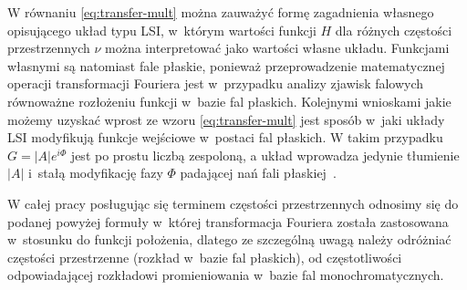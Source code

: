 W równaniu \ref{eq:transfer-mult} można zauważyć formę zagadnienia własnego opisującego układ typu LSI, w~którym wartości funkcji $H$ dla różnych częstości przestrzennych $\nu$ można interpretować jako wartości własne układu. Funkcjami własnymi są natomiast fale płaskie, ponieważ przeprowadzenie matematycznej operacji transformacji Fouriera jest w~przypadku analizy zjawisk falowych równoważne rozłożeniu funkcji w~bazie fal płaskich.  Kolejnymi wnioskami jakie możemy uzyskać wprost ze wzoru \ref{eq:transfer-mult} jest sposób w~jaki układy LSI modyfikują funkcje wejściowe w~postaci fal płaskich. W takim przypadku $G=|A|e^{i \Phi}$ jest po prostu liczbą zespoloną, a układ wprowadza jedynie tłumienie $|A|$ i~stałą modyfikację fazy $\Phi$ padającej nań fali płaskiej~\cite{citeulike:2926459}.

W całej pracy posługując się terminem częstości przestrzennych odnosimy się do podanej powyżej formuły w~której transformacja Fouriera została zastosowana w~stosunku do funkcji położenia, dlatego ze szczególną uwagą należy odróżniać częstości przestrzenne (rozkład w~bazie fal płaskich), od częstotliwości odpowiadającej rozkładowi promieniowania w~bazie fal monochromatycznych.

